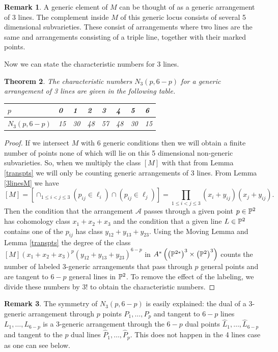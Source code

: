 \documentclass[12pt]{article}
\theoremstyle{plain}
\newtheorem{theorem}{Theorem}
\theoremstyle{definition}
\newtheorem{remark}[theorem]{Remark}
\newcommand{\A}{\mathcal{A}}
\newcommand{\N}{N}
\renewcommand{\P}{\ensuremath \mathbb{P}}
\begin{document}
\begin{remark} A generic element of $M$ can be thought of as a generic arrangement of 3 lines. The complement inside $M$ of this generic locus consists of several 5 dimensional subvarieties. These consist of arrangements where two lines are the same and arrangements consisting of a triple line, together with their marked points. \end{remark}

Now we can state the characteristic numbers for 3 lines.
 
\begin{theorem} \label{cn}
The characteristic numbers $\N_3(p,6-p)$ for a generic arrangement
of 3 lines are given in the following table.

\begin{tabular}{|l||l|l|l|l|l|l|l|}
\hline $p$ & 0 & 1 & 2 & 3 & 4 & 5 & 6  \\ \hline 

$\N_3(p,6-p)$ & 15 & 30 & 48 & 57 & 48 & 30 & 15 \\ \hline
\end{tabular}


\end{theorem}

\begin{proof}
If we intersect $M$ with 6 generic conditions then we will obtain a finite number of points none of which will lie on this 5 dimensional non-generic subvarieties. So, when we multiply the class $[M]$ with that from Lemma \ref{transpts} we will only be counting generic arrangements of 3 lines. From Lemma \ref{3linesM} we have $$[M] = [\cap_{1 \leq i < j \leq 3} (p_{ij} \in \ell_i) \cap (p_{ij}
\in \ell_j)] = \prod_{1 \leq i < j \leq 3} (x_i 
+ y_{ij})(x_j + y_{ij}).$$ Then the condition that the arrangement
$\A$ passes through a given point $p \in \P^2$ has cohomology class $x_1+x_2+x_3$
and the condition that a given line $L \in \P^2$ contains one of the
$p_{ij}$ has class $y_{12}+y_{13}+y_{23}$. Using the Moving Lemma and Lemma \ref{transpts} the degree of the class
$[M](x_1+x_2+x_3)^p(y_{12}+y_{13}+y_{23})^{6-p}$ in $A^*\left( \left(\P^{2*}\right)^3\times \left(\P^{2}\right)^3\right)$ counts the number of labeled 3-generic arrangements that pass
through $p$ general points and are tangent to $6-p$ general lines in
$\P^2$. To remove the effect of the labeling, we divide these numbers
by $3!$ to obtain the characteristic numbers. \end{proof}

\begin{remark}
The symmetry of $\N_3(p,6-p)$  is easily explained: the dual of a
3-generic arrangement through $p$ points $P_1,\ldots,P_p$ and tangent
to $6-p$ lines $L_1,\ldots,L_{6-p}$
is a 3-generic arrangement through the $6-p$ dual points
$\hat{L}_1,\ldots,\hat{L}_{6-p}$ and tangent to the $p$ dual lines
$\hat{P}_1,\ldots,\hat{P}_p$. This does not happen in the 4 lines case as one can see below.\end{remark}
\end{document}
